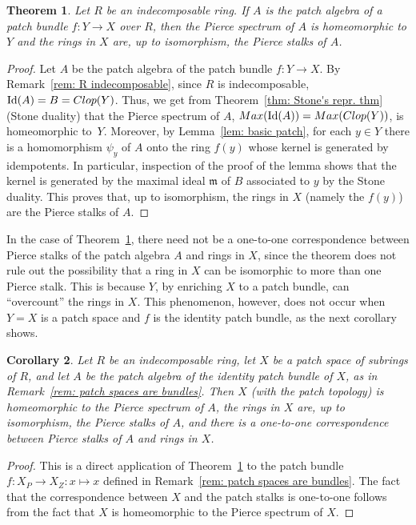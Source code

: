 \documentclass[11pt]{amsart}
\def\m{{\mathfrak m}} %
\newtheorem{theorem}{Theorem}[section]
\newtheorem{corollary}[theorem]{Corollary}
\theoremstyle{definition}
\def\Id{\mbox{\rm Id}}
\begin{document}
\begin{theorem} \label{thm: main indecomposable}
Let $R$ be an indecomposable ring. If $A$ is the patch algebra of a patch bundle  $f:Y \rightarrow X$ over $R$, then the Pierce spectrum of $A$ is homeomorphic to $Y$ and the rings in $X$ are, up to isomorphism, the Pierce stalks of $A$. 
\end{theorem}
\begin{proof}
Let $A$ be the patch algebra of the patch bundle  $f:Y \rightarrow X$. By Remark~\ref{rem: R indecomposable}, since $R$ is indecomposable, $\Id(A)=B={\rm Clop}(Y)$. Thus, we get from Theorem~\ref{thm: Stone's repr. thm} (Stone duality) that the Pierce spectrum of $A$, ${\rm Max}(\Id (A))={\rm Max}({\rm Clop}(Y))$, is homeomorphic to~$Y$. Moreover, by Lemma~\ref{lem: basic patch}, for each $y\in Y$ there is a homomorphism $\psi_y$ of $A$ onto the ring $f(y)$ whose kernel is generated by idempotents. In particular, inspection of the proof of the lemma shows that the kernel is generated by the maximal ideal $\m$ of $B$ associated to $y$ by the Stone duality. This proves that, up to isomorphism, the rings in $X$ (namely the $f(y)$) are the Pierce stalks of $A$.     
\end{proof}

In the case of Theorem~\ref{thm: main indecomposable}, there need not be a one-to-one correspondence between Pierce stalks of the patch algebra $A$ and rings in $X$, since the theorem does not rule out the possibility that  a  ring in $X$ can be isomorphic to more than one Pierce stalk. This is because $Y$, by enriching $X$ to a patch bundle, can ``overcount'' the rings in $X$. This phenomenon, however, does not occur when $Y = X$ is a patch space and $f$ is the identity patch bundle, as the next corollary shows.

 \begin{corollary} Let $R$ be an indecomposable ring,  let $X$ be a patch space of subrings of $R$, and let $A$ be the patch algebra of the identity patch bundle of $X$, as in  Remark~\ref{rem: patch spaces are bundles}. Then $X$ (with the patch topology) is  homeomorphic to the Pierce spectrum of $A$, 
 the rings in $X$ are, up to isomorphism, the Pierce stalks of $A$, and there is a one-to-one correspondence between Pierce stalks of $A$ and rings in $X$. 
\end{corollary}

\begin{proof}  
This is a direct application of Theorem~\ref{thm: main indecomposable} to the patch bundle $f: X_P \to X_Z \colon x\mapsto x$ defined in Remark~\ref{rem: patch spaces are bundles}. The fact that the correspondence between $X$ and the patch stalks is one-to-one follows from the fact that $X$ is homeomorphic to the Pierce spectrum of $X$.
\end{proof} 
\end{document}
